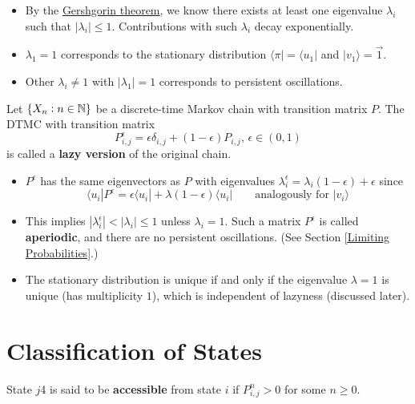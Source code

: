 \begin{itemize}
    \item By the \href{https://en.wikipedia.org/wiki/Gershgorin_circle_theorem}{Gershgorin theorem}, we know there exists at least one eigenvalue $\lambda_i$ such that $|\lambda_i| \le 1$. Contributions with such $\lambda_i$ decay exponentially.
    \item $\lambda_1 = 1$ corresponds to the stationary distribution $\langle \pi | = \langle u_1 |$ and $|v_1 \rangle = \vec{1}$.
    \item Other $\lambda_i \neq 1$ with $|\lambda_1| = 1$ corresponds to persistent oscillations.
\end{itemize}

\begin{definition}
Let $\{X_n : n \in \mathbb{N}\}$ be a discrete-time Markov chain with transition matrix $P$. The DTMC with transition matrix
$$
P_{i,j}^\epsilon = \epsilon \delta_{i,j} + (1 - \epsilon) P_{i,j},\, \epsilon \in (0,1)
$$
is called a \textbf{lazy version} of the original chain.
\end{definition}

\begin{itemize}
    \item $P^\epsilon$ has the same eigenvectors as $P$ with eigenvalues $\lambda_i^\epsilon = \lambda_i (1-\epsilon) + \epsilon$ since 
    $$
    \langle u_i | P^\epsilon = \epsilon \langle u_i | + \lambda ( 1 - \epsilon) \langle u_i | \qquad \text{analogously for }|v_i\rangle
    $$
    \item This implies $|\lambda_i^\epsilon| < |\lambda_i| \le 1$ unless $\lambda_i = 1$. Such a matrix $P^\epsilon$ is called \textbf{aperiodic}, and there are no persistent oscillations. (See Section \ref{Limiting Probabilities}.)
    \item The stationary distribution is unique if and only if the eigenvalue $\lambda= 1$ is unique
    (has multiplicity $1$), which is independent of lazyness (discussed later).
\end{itemize}


\section{Classification of States}

\begin{definition}[Accessibility]
    State $j$4 is said to be \textbf{accessible} from state $i$ if $P^n_{i,j} > 0$ for some $n \ge 0$.
\end{definition}

